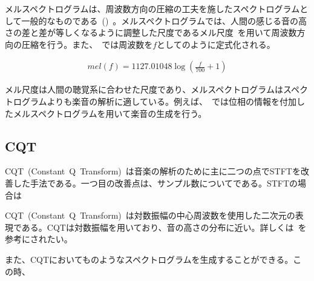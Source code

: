 \clearpage

メルスペクトログラムは、周波数方向の圧縮の工夫を施したスペクトログラムとして一般的なものである~()~。メルスペクトログラムでは、人間の感じる音の高さの差と差が等しくなるように調整した尺度であるメル尺度~\cite{melscale}を用いて周波数方向の圧縮を行う。また、~\cite{mel}では周波数を$f$としてのように定式化される。

\begin{align}
    \label{eq:mel}
    mel(f)=1127.01048\log{(\frac{f}{700}+1)}
\end{align}

メル尺度は人間の聴覚系に合わせた尺度であり、メルスペクトログラムはスペクトログラムよりも楽音の解析に適している。例えば、~\cite{GANSynth}では位相の情報を付加したメルスペクトログラムを用いて楽音の生成を行う。

\subsection{CQT}

CQT~(Constant~Q~Transform)~は音楽の解析のために主に二つの点でSTFTを改善した手法である。一つ目の改善点は、サンプル数についてである。STFTの場合は

CQT~(Constant~Q~Transform)~\cite{CQT}は対数振幅の中心周波数を使用した二次元の表現である。CQTは対数振幅を用いており、音の高さの分布に近い。詳しくは~\cite{CQT}を参考にされたい。

また、CQTにおいてものようなスペクトログラムを生成することができる。この時、

